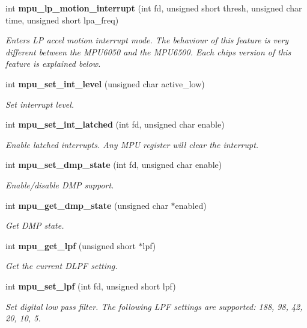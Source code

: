 \begin{DoxyCompactItemize}
int \textbf{ mpu\+\_\+lp\+\_\+motion\+\_\+interrupt} (int fd, unsigned short thresh, unsigned char time, unsigned short lpa\+\_\+freq)
\begin{DoxyCompactList}\small\item\em Enters LP accel motion interrupt mode. The behaviour of this feature is very different between the M\+P\+U6050 and the M\+P\+U6500. Each chip\textquotesingle{}s version of this feature is explained below. \end{DoxyCompactList}\item 
int \textbf{ mpu\+\_\+set\+\_\+int\+\_\+level} (unsigned char active\+\_\+low)
\begin{DoxyCompactList}\small\item\em Set interrupt level. \end{DoxyCompactList}\item 
int \textbf{ mpu\+\_\+set\+\_\+int\+\_\+latched} (int fd, unsigned char enable)
\begin{DoxyCompactList}\small\item\em Enable latched interrupts. Any M\+PU register will clear the interrupt. \end{DoxyCompactList}\item 
int \textbf{ mpu\+\_\+set\+\_\+dmp\+\_\+state} (int fd, unsigned char enable)
\begin{DoxyCompactList}\small\item\em Enable/disable D\+MP support. \end{DoxyCompactList}\item 
int \textbf{ mpu\+\_\+get\+\_\+dmp\+\_\+state} (unsigned char $\ast$enabled)
\begin{DoxyCompactList}\small\item\em Get D\+MP state. \end{DoxyCompactList}\item 
int \textbf{ mpu\+\_\+get\+\_\+lpf} (unsigned short $\ast$lpf)
\begin{DoxyCompactList}\small\item\em Get the current D\+L\+PF setting. \end{DoxyCompactList}\item 
int \textbf{ mpu\+\_\+set\+\_\+lpf} (int fd, unsigned short lpf)
\begin{DoxyCompactList}\small\item\em Set digital low pass filter. The following L\+PF settings are supported\+: 188, 98, 42, 20, 10, 5. \end{DoxyCompactList}\item 

\end{DoxyCompactItemize}
